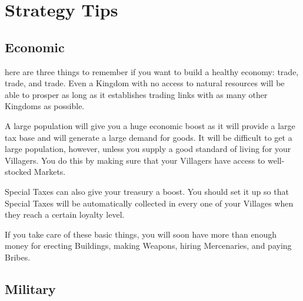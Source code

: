 
\chapter{Strategy Tips}


\section{Economic}


here are three things to remember if you want to build a healthy economy: trade, trade, and trade. Even a Kingdom with no access to natural resources will be able to prosper as long as it establishes trading links with as many other Kingdoms as possible.

A large population will give you a huge economic boost as it will provide a large tax base and will generate a large demand for goods. It will be difficult to get a large population, however, unless you supply a good standard of living for your Villagers. You do this by making sure that your Villagers have access to well-stocked Markets.

Special Taxes can also give your treasury a boost. You should set it up so that Special Taxes will be automatically collected in every one of your Villages when they reach a certain loyalty level.

If you take care of these basic things, you will soon have more than enough money for erecting Buildings, making Weapons, hiring Mercenaries, and paying Bribes.

\section{Military}

